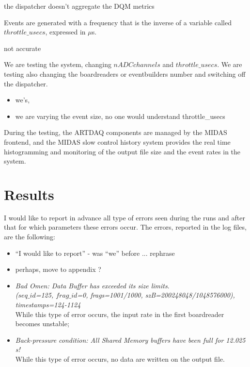 \documentclass[12pt]{article}
\newcommand {\add}[1]    {{\red #1}}
\newcommand {\red}       {\color{red}}
\begin{document}
\add{the dispatcher doesn't aggregate the DQM metrics}

Events are generated with a frequency that is the inverse of a variable called $throttle\_ usecs$,
expressed in $\mu$s.

\add{not accurate}

We are testing the system, changing $nADCchannels$ and $throttle\_usecs$. We are testing also changing the boardreaders or eventbuilders number and switching off the dispatcher.

\add{
  \begin{itemize}
  \item 
    we's, 
  \item
    we are varying the event size, no one would understand throttle\_usecs
  \end{itemize}
}
\add{
  During the testing, the ARTDAQ components are managed by the MIDAS frontend,
  and the MIDAS slow control history system provides the real time histogramming
  and monitoring of the output file size and the event rates in the system.
}
\section{Results}
I would like to report in advance all type of errors seen during the runs and after that for which parameters these errors occur. The errors, reported in the log files, are the following:

\add{
  \begin{itemize}
  \item 
    ``I would like to report'' - was ``we'' before ... rephrase 
  \item
    perhaps, move to appendix ?
  \end{itemize}
}

\begin{itemize}
\item \textit{Bad Omen: Data Buffer has exceeded its size limits}.
  \\
  \textit{($seq\_id$=125, $frag\_id$=0, frags=1001/1000, szB=200248048/1048576000), timestamps=124-1124}
  \\
  While this type of error occurs, the input rate in the first boardreader becomes unstable;
\item \textit{Back-pressure condition: All Shared Memory buffers have been full for 12.025 s!}
  \\
  While this type of error occurs, no data are written on the output file.
\end{itemize}
\end{document}
